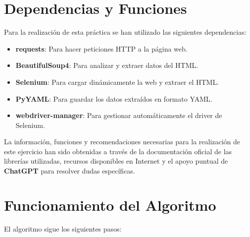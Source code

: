 \documentclass[a4paper,12pt]{article}
\begin{document}
\section{Dependencias y Funciones}
Para la realización de esta práctica se han utilizado las siguientes dependencias:

\begin{itemize}
    \item \textbf{requests}: Para hacer peticiones HTTP a la página web.
    \item \textbf{BeautifulSoup4}: Para analizar y extraer datos del HTML.
    \item \textbf{Selenium}: Para cargar dinámicamente la web y extraer el HTML.
    \item \textbf{PyYAML}: Para guardar los datos extraídos en formato YAML.
    \item \textbf{webdriver-manager}: Para gestionar automáticamente el driver de Selenium.
\end{itemize}

La información, funciones y recomendaciones necesarias para la realización de este ejercicio han sido obtenidas a través de la documentación oficial de las librerías utilizadas, recursos disponibles en Internet y el apoyo puntual de \textbf{ChatGPT} para resolver dudas específicas.

\section{Funcionamiento del Algoritmo}
El algoritmo sigue los siguientes pasos:
\end{document}
